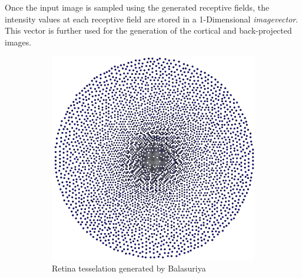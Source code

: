 \documentclass{l4proj}
\begin{document}

Once the input image is sampled using the generated receptive fields, the intensity values at each receptive field are stored in a 1-Dimensional \textit{imagevector}. This vector is further used for the generation of the cortical and back-projected images.

\begin{figure}[H]

  \begin{subfigure}[b]{0.49\textwidth}
    \includegraphics[width=\textwidth]{l4template-master/4ktess.png}
    \caption{Retina tesselation generated by Balasuriya}
    \label{tesselation}
  \end{subfigure}
  \begin{subfigure}[b]{0.49\textwidth}

\end{subfigure}
\end{figure}
\end{document}
